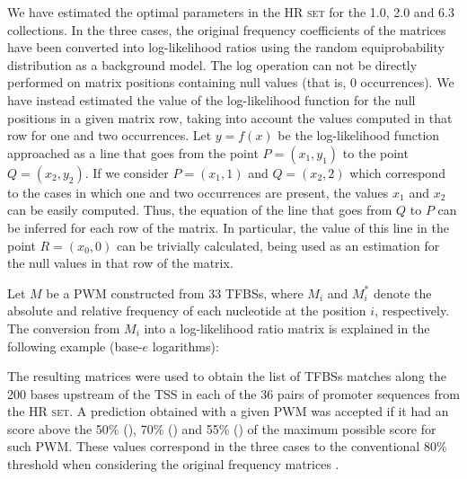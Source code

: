 We have estimated the optimal parameters in the \textsc{HR set} for the  1.0, 
  2.0  and  6.3 collections. 
In the three cases, the original frequency coefficients of the matrices have been
converted into log-likelihood ratios using the random equiprobability 
distribution as a background model. The log operation can not be directly
performed on matrix positions containing null values (that is, 0 occurrences).
We have instead estimated the value of the log-likelihood function for the null positions 
in a given matrix row, taking into account the values computed in that row for 
one and two occurrences. Let $y = f(x)$ be the log-likelihood function 
approached as a line that goes from the point $P=(x_1,y_1)$ to the point 
$Q=(x_2,y_2)$. If we consider $P=(x_1,1)$ and $Q=(x_2,2)$ 
which correspond to the cases in which one and two occurrences are present,
the values $x_1$ and $x_2$ can be easily computed. Thus, the equation of the
line that goes from $Q$ to $P$ can be inferred for each row of the matrix.
In particular, the value of this line in the point $R=(x_0,0)$ can be
trivially calculated, being used as an estimation for the null values in
that row of the matrix. 

Let $M$ be a PWM constructed from $33$ TFBSs, where $M_i$ and $M_i^*$ denote the 
absolute and relative frequency of each nucleotide at the position $i$, respectively. The
conversion from $M_i$ into a log-likelihood ratio matrix is explained in the 
following example (base-$e$ logarithms):

\begin{center}
\end{center}

The resulting matrices were used to obtain the list of TFBSs matches 
along the 200 bases upstream of the TSS in each of the 36 pairs of promoter 
sequences from the \textsc{HR set}. A prediction obtained with a given PWM 
was accepted if it had an score above the 50\% (), 70\% () and 55\%
() of the maximum possible score for such PWM. These values
correspond in the three cases to the conventional 80\% threshold when
considering the original frequency matrices \citep{blanco:2006b}. 

